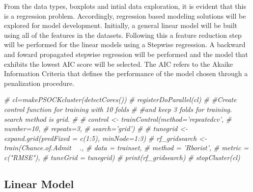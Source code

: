 \documentclass[11pt,]{article}
\newenvironment{Shaded}{\begin{snugshade}}{\end{snugshade}}
\newcommand{\CommentTok}[1]{\textcolor[rgb]{0.56,0.35,0.01}{\textit{#1}}}
\newcommand{\DataTypeTok}[1]{\textcolor[rgb]{0.13,0.29,0.53}{#1}}
\newcommand{\KeywordTok}[1]{\textcolor[rgb]{0.13,0.29,0.53}{\textbf{#1}}}
\newcommand{\NormalTok}[1]{#1}
\newcommand{\OperatorTok}[1]{\textcolor[rgb]{0.81,0.36,0.00}{\textbf{#1}}}
\begin{document}
From the data types, boxplots and intial data exploration, it is evident
that this is a regression problem. Accordingly, regression based
modeling solutions will be explored for model development. Initially, a
general linear model will be built using all of the features in the
datasets. Following this a feature reduction step will be performed for
the linear models using a Stepwise regression. A backward and foward
propagated stepwise regression will be performed and the model that
exhibits the lowest AIC score will be selected. The AIC refers to the
Akaike Information Criteria that defines the performance of the model
chosen through a penalization procedure.

\begin{Shaded}
\begin{Highlighting}[]
\CommentTok{# cl=makePSOCKcluster(detectCores())}
\CommentTok{# registerDoParallel(cl)}
\CommentTok{# #Create control function for training with 10 folds}
\CommentTok{# #and keep 3 folds for training. search method is grid.}
\CommentTok{# }
\CommentTok{# control <- trainControl(method='repeatedcv',}
\CommentTok{#                         number=10,}
\CommentTok{#                         repeats=3,}
\CommentTok{#                         search='grid')}
\CommentTok{# }
\CommentTok{# tunegrid <- expand.grid(predFixed = c(1:5), minNode=1:3)}
\CommentTok{# rf_gridsearch <- train(Chance.of.Admit ~ .,}
\CommentTok{#                        data = trainset,}
\CommentTok{#                        method = 'Rborist',}
\CommentTok{#                        metric = c("RMSE"),}
\CommentTok{#                       tuneGrid = tunegrid)}
\CommentTok{# print(rf_gridsearch)}
\CommentTok{# stopCluster(cl)}
\end{Highlighting}
\end{Shaded}

\hypertarget{linear-model}{%
\subsection{Linear Model}\label{linear-model}}

\begin{Shaded}
\end{Shaded}
\end{document}
